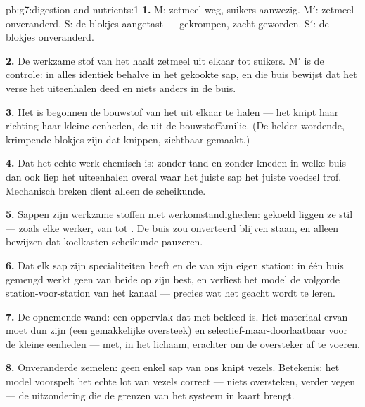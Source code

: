 \begin{solution}{pb:g7:digestion-and-nutrients:1}
\textbf{1.} M: zetmeel weg, suikers aanwezig. M$'$: zetmeel onveranderd.
S: de blokjes aangetast --- gekrompen, zacht geworden. S$'$: de blokjes
onveranderd.

\textbf{2.} De werkzame stof van het  haalt zetmeel uit elkaar tot
suikers. M$'$ is de controle: in alles identiek behalve in het gekookte
sap, en die buis bewijst dat het verse  het uiteenhalen deed en
niets anders in de buis.

\textbf{3.} Het is begonnen de bouwstof van het  uit elkaar te halen ---
het knipt haar richting haar kleine eenheden, de  uit de
bouwstoffamilie. (De helder wordende, krimpende blokjes zijn dat knippen,
zichtbaar gemaakt.)

\textbf{4.} Dat het echte werk chemisch is: zonder tand en zonder kneden
in welke buis dan ook liep het uiteenhalen overal waar het juiste sap het
juiste voedsel trof. Mechanisch breken dient alleen de scheikunde.

\textbf{5.} Sappen zijn werkzame stoffen met werkomstandigheden: gekoeld
liggen ze stil --- zoals elke werker, van  tot . De buis zou
onverteerd blijven staan, en alleen bewijzen dat koelkasten scheikunde
pauzeren.

\textbf{6.} Dat elk sap zijn specialiteiten heeft en de  van
zijn eigen station: in één buis gemengd werkt geen van beide op zijn best,
en verliest het model de volgorde station-voor-station van het kanaal ---
precies wat het geacht wordt te leren.

\textbf{7.} De opnemende wand: een oppervlak dat met  bekleed
is. Het materiaal ervan moet dun zijn (een gemakkelijke oversteek) en
selectief-maar-doorlaatbaar voor de kleine eenheden --- met, in het
lichaam,  erachter om de oversteker af te voeren.

\textbf{8.} Onveranderde zemelen: geen enkel sap van ons knipt vezels.
Betekenis: het model voorspelt het echte lot van vezels correct --- niets
oversteken, verder vegen --- de uitzondering die de grenzen van het
systeem in kaart brengt.


\end{solution}
